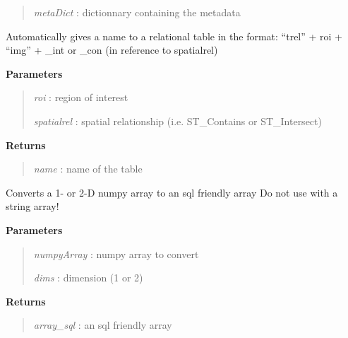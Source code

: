 \documentclass[letterpaper,10pt,openany,oneside]{sphinxmanual}
\begin{document}
\begin{fulllineitems}
\begin{fulllineitems}
\begin{quote}
\emph{metaDict} : dictionnary containing the metadata
\end{quote}

\end{fulllineitems}


\begin{fulllineitems}
\label{code:Database.Database.nameRelationTable}
Automatically gives a name to a relational table in the format: ``trel'' + roi + ``img'' + \_int or \_con (in reference to spatialrel)

\textbf{Parameters}
\begin{quote}

\emph{roi}        : region of interest

\emph{spatialrel} : spatial relationship (i.e. ST\_Contains or ST\_Intersect)
\end{quote}

\textbf{Returns}
\begin{quote}

\emph{name}       : name of the table
\end{quote}

\end{fulllineitems}


\begin{fulllineitems}
\label{code:Database.Database.numpy2sql}
Converts a 1- or 2-D numpy array to an sql friendly array
Do not use with a string array!

\textbf{Parameters}
\begin{quote}

\emph{numpyArray} : numpy array to convert

\emph{dims}       : dimension (1 or 2)
\end{quote}

\textbf{Returns}
\begin{quote}

\emph{array\_sql}  : an sql friendly array
\end{quote}

\end{fulllineitems}



\end{fulllineitems}
\end{document}
